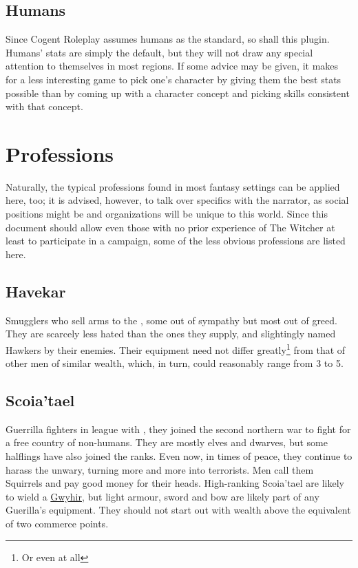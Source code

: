 \documentclass[parskip=full,11pt,%
footheight=38pt]{scrreport}
\begin{document}
\subsection{Humans}
Since Cogent Roleplay assumes humans as the standard, so shall this plugin. Humans' stats are simply the default,
but they will not draw any special attention to themselves in most regions. If some advice may be given, it makes
for a less interesting game to pick one's character by giving them the best stats possible than by coming up with
a character concept and picking skills consistent with that concept.

\section{Professions}
Naturally, the typical professions found in most fantasy settings can be applied here, too; it is advised, however, to talk over specifics with
the narrator, as social positions might be and organizations will be unique to this world. Since this document should allow even those with no
prior experience of The Witcher at least to participate in a campaign, some of the less obvious professions are listed here.

\subsection{Havekar}
Smugglers who sell arms to the , some out of sympathy but most out of greed. They are scarcely less hated than the ones they supply,
and slightingly named Hawkers by their enemies. Their equipment need not differ greatly\footnote{Or even at all} from that of other men of similar
wealth, which, in turn, could reasonably range from 3 to 5.

\subsection{Scoia'tael}\label{profession:scoiatael}
Guerrilla fighters in league with , they joined the second northern war to fight for a free country of non-humans.
They are mostly elves and dwarves, but some halflings have also joined the ranks. Even now, in times of peace, they continue to harass the
unwary, turning more and more into terrorists. Men call them Squirrels and pay good money for their heads. High-ranking Scoia'tael are
likely to wield a \hyperref[weapon:gwyhir]{Gwyhir}, but light armour, sword and bow are likely part of any Guerilla's equipment.
They should not start out with wealth above the equivalent of two commerce points.
\end{document}
